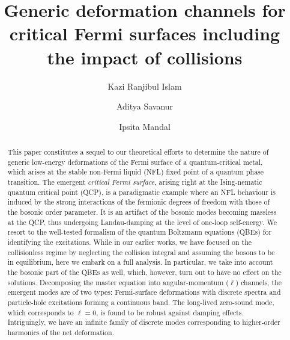 \documentclass[aps, prb, onecolumn, nofootinbib, citeautoscript, 10pt]{revtex4-2}
\begin{document}
 
	
\title{Generic deformation channels for critical Fermi surfaces including the impact of collisions}


\author{Kazi Ranjibul Islam}

\author{Aditya Savanur}

\author{Ipsita Mandal}


\begin{abstract}
This paper constitutes a sequel to our theoretical efforts to determine the nature of generic low-energy deformations of the Fermi surface of a quantum-critical metal, which arises at the stable non-Fermi liquid (NFL) fixed point of a quantum phase transition. The emergent \textit{critical Fermi surface}, arising right at the Ising-nematic quantum critical point (QCP), is a paradigmatic example where an NFL behaviour is induced by the strong interactions of the fermionic degrees of freedom with those of the bosonic order parameter. It is an artifact of the bosonic modes becoming massless at the QCP, thus undergoing Landau-damping at the level of one-loop self-energy. We resort to the well-tested formalism of the quantum Boltzmann equations (QBEs) for identifying the excitations. While in our earlier works, we have focused on the collisionless regime by neglecting the collision integral and assuming the bosons to be in equilibrium, here we embark on a full analysis. In particular, we take into account the bosonic part of the QBEs as well, which, however, turn out to have no effect on the solutions. Decomposing the master equation into angular-momentum ($\ell$) channels, the emergent modes are of two types: Fermi-surface deformations with discrete spectra and particle-hole excitations forming a continuous band. The long-lived zero-sound mode, which corresponds to $\ell = 0$, is found to be robust against damping effects. Intriguingly, we have an infinite family of discrete modes corresponding to higher-order harmonics of the net deformation.
\end{abstract}


\maketitle
\end{document}
